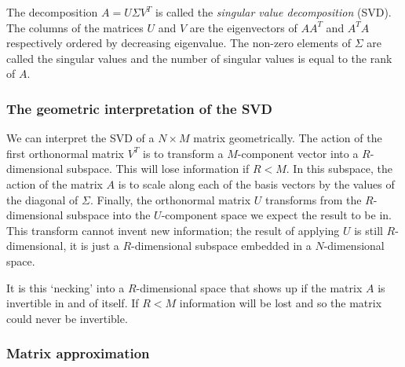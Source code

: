 \documentclass[a4paper]{article}
\newcommand{\highlight}[1]{{\color{blue}#1}}
\begin{document}
The decomposition $A = U \Sigma V^T$ is called the \emph{singular value
decomposition} (SVD). \highlight{The columns of the matrices $U$ and $V$ are the
eigenvectors of $AA^T$ and $A^TA$ respectively} ordered by decreasing
eigenvalue. The non-zero elements of $\Sigma$ are called the singular values and
\highlight{the number of singular values is equal to the rank of $A$}.

\subsubsection{The geometric interpretation of the SVD}

We can interpret the SVD of a $N \times M$ matrix geometrically. The action of
the first orthonormal matrix $V^T$ is to transform a $M$-component vector into a
$R$-dimensional subspace. This will lose information if $R < M$. In this
subspace, the action of the matrix $A$ is to scale along each of the basis
vectors by the values of the diagonal of $\Sigma$. Finally, the orthonormal
matrix $U$ transforms from the $R$-dimensional subspace into the $U$-component
space we expect the result to be in. This transform cannot invent new
information; the result of applying $U$ is still $R$-dimensional, it is just a
$R$-dimensional subspace embedded in a $N$-dimensional space.

It is this `necking' into a $R$-dimensional space that shows up if the matrix
$A$ is invertible in and of itself. If $R < M$ information will be lost and so
the matrix could never be invertible.

\subsubsection{Matrix approximation}
\end{document}
